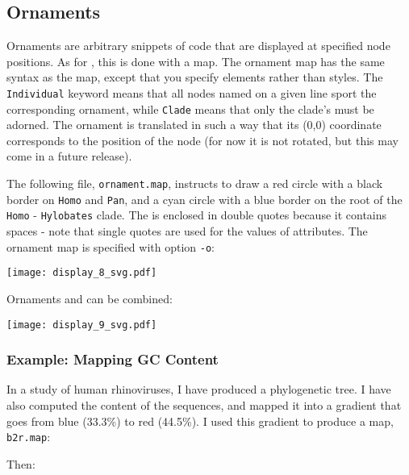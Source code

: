\subsection{Ornaments}

Ornaments are arbitrary snippets of \svg{} code that are displayed at specified
node positions. As for \css, this is done with a map. The ornament map has the
same syntax as the \css{} map, except that you specify \svg{} elements rather
than \css{} styles. The \texttt{Individual} keyword means that all nodes named
on a given line sport the corresponding ornament, while \texttt{Clade} means
that only the clade's \lca{} must be adorned. The ornament is translated in
such a way that its (0,0) coordinate corresponds to the position of the node (for now it is not rotated, but this may come in a future release).

The following file, \texttt{ornament.map}, instructs to draw a red circle with
a black border on \texttt{Homo} and \texttt{Pan}, and a cyan circle with a blue
border on the root of the \texttt{Homo} - \texttt{Hylobates} clade. The \svg{}
is enclosed in double quotes because it contains spaces - note that single
quotes are used for the values of \xml{} attributes. The ornament map is
specified with option \texttt{-o}:
\begin{quote}
 
\end{quote}

\begin{center}
 \texttt{[image: display\_8\_svg.pdf]}
\end{center}
Ornaments and \css{} can be combined:

\begin{center}
 \texttt{[image: display\_9\_svg.pdf]}
\end{center}

\subsubsection{Example: Mapping GC Content}

In a study of human rhinoviruses, I have produced a phylogenetic tree. I have
also computed the \gc{} content of the sequences, and mapped it into a gradient
that goes from {\color{Blue} blue} (33.3\%) to {\color{Red} red} (44.5\%). I
used this gradient to produce a \css{} map, \texttt{b2r.map}:




\noindent{}Then:

